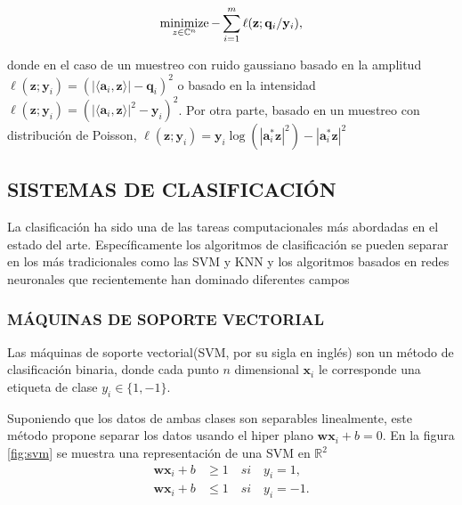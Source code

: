 \begin{itemize}
    \begin{equation}
        \operatorname*{minimize}_{z \in \mathbb{C}^{n}} -\sum_{i=1}^{m} \ell(\mathbf{z};\mathbf{q}_i/\mathbf{y}_i),
    \end{equation}
    
    donde en el caso de un muestreo con ruido gaussiano basado en la amplitud $\ell(\mathbf{z};\mathbf{y}_i) = (\vert \langle \mathbf{a}_i,\mathbf{z}\rangle \vert - \mathbf{q}_i)^2$ o basado en la intensidad  $\ell(\mathbf{z};\mathbf{y}_i) = (\vert \langle \mathbf{a}_i,\mathbf{z}\rangle \vert^2 - \mathbf{y}_i)^2$. Por otra parte, basado en un muestreo con distribución de Poisson, $\ell(\mathbf{z};\mathbf{y}_i) = { \mathbf{y}_i \log(|\mathbf{a}_i^* \mathbf{z}|^2) -|\mathbf{a}_i^* \mathbf{z}|^2 }$ 
\end{itemize}





\subsection{SISTEMAS DE CLASIFICACIÓN}

La clasificación ha sido una de las tareas computacionales más abordadas en el estado del arte. Específicamente los algoritmos de clasificación se pueden separar en los más tradicionales como las SVM y KNN\cite{kim12012comparing} y los algoritmos basados en redes neuronales que recientemente han dominado diferentes campos\cite{li2019deep,li2018deep, wang2019development}
\subsubsection{MÁQUINAS DE SOPORTE VECTORIAL}


Las máquinas de soporte vectorial(SVM, por su sigla en inglés) \cite{suthaharan2016support} son un método de clasificación binaria, donde cada punto $n$ dimensional $\mathbf{x}_i$ le corresponde una etiqueta de clase $y_i \in \{1,-1\}$.

Suponiendo que los datos de ambas clases son separables linealmente, este método propone separar los datos usando el hiper plano $\mathbf{w}\mathbf{x}_i + b = 0$. En la figura \ref{fig:svm} se muestra una representación de una SVM en $\mathbb{R}^2$
\begin{equation}
    \begin{split}
        \mathbf{w}\mathbf{x}_i + b &\geq 1 \quad si \quad y_i=1, \\
        \mathbf{w}\mathbf{x}_i + b &\leq 1 \quad si \quad y_i=-1.
    \end{split}
\end{equation}

